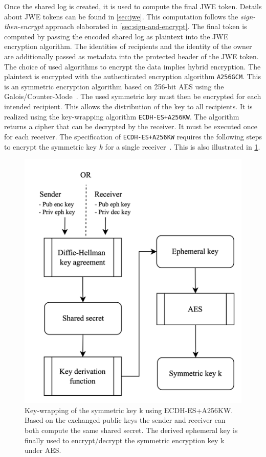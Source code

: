\documentclass[../main.tex]{subfiles}
\begin{document}
\begin{itemize}
Once the  shared log is created, it is used to compute the final JWE token.
Details about JWE tokens can be found in \cref{sec:jwe}.
This computation follows the \emph{sign-then-encrypt} approach elaborated in \cref{sec:sign-and-encrypt}.
The final token is computed by passing the encoded shared log as plaintext into the JWE encryption algorithm.
The identities of recipients and the identity of the owner are additionally passed as metadata into the protected header of the JWE token.
The choice of used algorithms to encrypt the data implies hybrid encryption.
The plaintext is encrypted with the authenticated encryption algorithm \verb|A256GCM|.
This is an symmetric encryption algorithm based on 256-bit AES using the Galois/Counter-Mode~\cite{JWA2015}.
The used symmetric key must then be encrypted for each intended recipient.
This allows the distribution of the key to all recipients.
It is realized using the key-wrapping algorithm \verb|ECDH-ES+A256KW|.
The algorithm returns a cipher that can be decrypted by the receiver.
It must be executed once for each receiver.
The specification of \verb|ECDH-ES+A256KW| requires the following steps to encrypt the symmetric key $k$ for a single receiver~\cite[100]{Barker2017}.
This is also illustrated in \cref{fig:key_wrapping}.
\begin{figure}[ht]
    \includegraphics[scale=0.2]{../img/05/key_wrapping.png}
    \centering
    \caption[Key-wrapping ECDH-ES+A256KW]{
        Key-wrapping of the symmetric key k using ECDH-ES+A256KW.
        Based on the exchanged public keys the sender and receiver can both compute the same shared secret.
        The derived ephemeral key is finally used to encrypt/decrypt the symmetric encryption key k under AES.}
    \label{fig:key_wrapping}
\end{figure}


\end{itemize}
\end{document}
